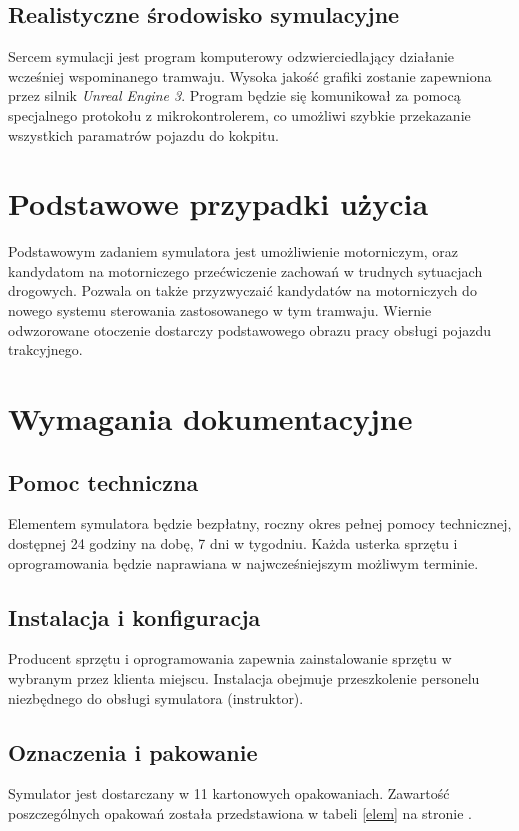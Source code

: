 \documentclass[12pt,a4paper]{article}
\begin{document}
\subsection{Realistyczne środowisko symulacyjne}
Sercem symulacji jest program komputerowy odzwierciedlający działanie wcześniej wspominanego tramwaju. Wysoka jakość grafiki
zostanie zapewniona przez silnik \textit{Unreal Engine 3}\cite{UE}. Program będzie się komunikował za pomocą specjalnego protokołu z mikrokontrolerem,
co umożliwi szybkie przekazanie wszystkich paramatrów pojazdu do kokpitu.
	\newpage
	
\section{Podstawowe przypadki użycia}
Podstawowym zadaniem symulatora jest umożliwienie motorniczym, oraz kandydatom na motorniczego przećwiczenie zachowań w trudnych sytuacjach drogowych. Pozwala on także przyzwyczaić kandydatów na motorniczych do nowego systemu sterowania zastosowanego w tym tramwaju. Wiernie odwzorowane otoczenie dostarczy podstawowego obrazu pracy obsługi pojazdu trakcyjnego.
	\newpage
	
\section{Wymagania dokumentacyjne}
\subsection{Pomoc techniczna}
Elementem symulatora będzie bezpłatny, roczny okres pełnej pomocy technicznej, dostępnej 24 godziny na dobę, 7 dni w tygodniu. Każda usterka sprzętu i oprogramowania będzie naprawiana w najwcześniejszym możliwym terminie.

\subsection{Instalacja i konfiguracja}
Producent sprzętu i oprogramowania zapewnia zainstalowanie sprzętu w wybranym przez klienta miejscu. Instalacja obejmuje przeszkolenie personelu niezbędnego do obsługi symulatora (instruktor).

\subsection{Oznaczenia i pakowanie}
Symulator jest dostarczany w 11 kartonowych opakowaniach. Zawartość poszczególnych opakowań została przedstawiona w tabeli \ref{elem} na stronie \pageref{elem}.
\end{document}
